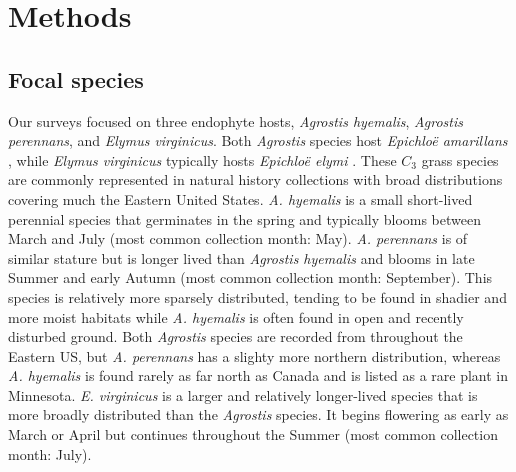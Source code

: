 \documentclass[11pt]{article}
\let\cite\citep
\begin{document}
\section*{Methods}
        \subsection*{Focal species}
Our surveys focused on three endophyte hosts, \emph{Agrostis hyemalis}, \emph{Agrostis perennans}, and \emph{Elymus virginicus}. Both \emph{Agrostis} species host \emph{Epichloë amarillans} \cite{craven2001multigene, leuchtmann2014nomenclatural}, while \emph{Elymus virginicus} typically hosts \emph{Epichloë elymi} \cite{clay2002evolutionary}.
These $C_3$ grass species are commonly represented in natural history collections with broad distributions covering much the Eastern United States.
\emph{A. hyemalis} is a small short-lived perennial species that germinates in the spring and typically blooms between March and July (most common collection month: May).
\emph{A. perennans} is of similar stature but is longer lived than \emph{Agrostis hyemalis} and blooms in late Summer and early Autumn (most common collection month: September). 
This species is relatively more sparsely distributed, tending to be found in shadier and more moist habitats while \emph{A. hyemalis} is often found in open and recently disturbed ground. 
Both \emph{Agrostis} species are recorded from throughout the Eastern US, but \emph{A. perennans} has a slighty more northern distribution, whereas \emph{A. hyemalis} is found rarely as far north as Canada and is listed as a rare plant in Minnesota.
\emph{E. virginicus} is a larger and relatively longer-lived  species that is more broadly distributed than the \emph{Agrostis} species. 
It begins flowering as early as March or April but continues throughout the Summer (most common collection month: July).
\end{document}

